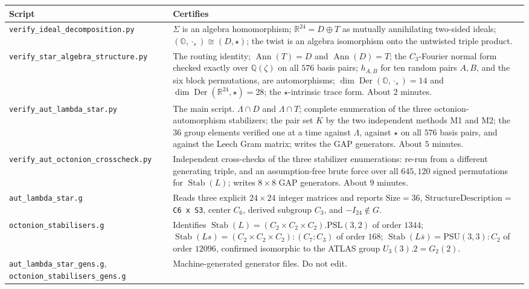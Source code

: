 \documentclass[11pt]{amsart}
\newcommand{\LL}{\Lambda}
\newcommand{\OO}{\mathbb{O}}
\newcommand{\QQ}{\mathbb{Q}}
\newcommand{\RR}{\mathbb{R}}
\DeclareMathOperator{\Der}{Der}
\DeclareMathOperator{\Ann}{Ann}
\DeclareMathOperator{\Stab}{Stab}
\theoremstyle{definition}
\theoremstyle{remark}
\begin{document}
\begin{center}
\small
\begin{longtable}{>{\raggedright\arraybackslash}p{}>{\raggedright\arraybackslash}p{}}
\toprule
Script & Certifies \\
\midrule
\endhead
\texttt{verify\_ideal\_decomposition.py}
  & $\Sigma$ is an algebra homomorphism; $\RR^{24} = D \oplus T$ as mutually
    annihilating two-sided ideals; $(\OO,\cdot_s) \cong (D,\star)$; the twist
    is an algebra isomorphism onto the untwisted triple product. \\
\addlinespace
\texttt{verify\_star\_algebra\_structure.py}
  & The routing identity; $\Ann(T) = D$ and $\Ann(D) = T$; the $C_3$-Fourier
    normal form checked exactly over $\QQ(\zeta)$ on all $576$ basis pairs;
    $h_{A,B}$ for ten random pairs $A, B$, and the six block permutations,
    are automorphisms;
    $\dim \Der(\OO,\cdot_s) = 14$ and $\dim \Der(\RR^{24},\star) = 28$; the
    $\star$-intrinsic trace form. About $2$ minutes. \\
\addlinespace
\texttt{verify\_aut\_lambda\_star.py}
  & The main script. $\LL \cap D$ and $\LL \cap T$; complete enumeration of the
    three octonion-automorphism stabilizers; the pair set $K$ by the two
    independent methods M1 and M2; the $36$ group elements verified one at a
    time against $\LL$, against $\star$ on all $576$ basis pairs, and against
    the Leech Gram matrix; writes the GAP generators. About $5$ minutes. \\
\addlinespace
\texttt{verify\_aut\_octonion\_crosscheck.py}
  & Independent cross-checks of the three stabilizer enumerations: re-run from a
    different generating triple, and an assumption-free brute force over all
    $645{,}120$ signed permutations for $\Stab(L)$; writes $8 \times 8$ GAP
    generators. About $9$ minutes. \\
\addlinespace
\texttt{aut\_lambda\_star.g}
  & Reads three explicit $24\times24$ integer matrices and reports
    $\mathrm{Size} = 36$, $\mathrm{StructureDescription} = $ \texttt{C6 x S3},
    center $C_6$, derived subgroup $C_3$, and $-I_{24} \notin G$. \\
\addlinespace
\texttt{octonion\_stabilisers.g}
  & Identifies $\Stab(L) = (C_2{\times}C_2{\times}C_2).\mathrm{PSL}(3,2)$ of
    order $1344$; $\Stab(Ls) = (C_2{\times}C_2{\times}C_2){:}(C_7{:}C_3)$ of
    order $168$; $\Stab(L\bar s) = \mathrm{PSU}(3,3){:}C_2$ of order $12096$,
    confirmed isomorphic to the ATLAS group $U_3(3).2 = G_2(2)$. \\
\addlinespace
\texttt{aut\_lambda\_star\_gens.g},
\texttt{octonion\_stabilisers\_gens.g}
  & Machine-generated generator files. Do not edit. \\
\bottomrule
\end{longtable}
\end{center}
\end{document}

